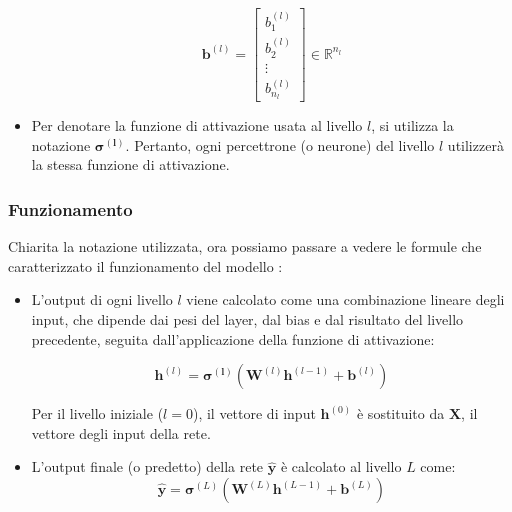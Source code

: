 \begin{itemize}
    \[
        \mathbf{b}^{(l)} = 
        \begin{bmatrix}
        b_1^{(l)} \\
        b_2^{(l)} \\
        \vdots \\
        b_{n_l}^{(l)}
        \end{bmatrix}
        \in \mathbb{R}^{n_l}
    \]

    \item Per denotare la funzione di attivazione usata al livello $l$, si
    utilizza la notazione $\boldsymbol{\sigma^{(l)}}$. Pertanto, ogni percettrone (o neurone) 
    del livello $l$ utilizzerà la stessa funzione di attivazione.
    
\end{itemize}
\subsubsection{Funzionamento}
Chiarita la notazione utilizzata, ora possiamo passare a vedere le formule che
caratterizzato il funzionamento del modello 
\cite{GradientDescent_NeuralNetworks,ALL_DEEP_LEARNING,ASPETTI_MLP_1,ASPETTI_MLP_2}:
\begin{itemize}

    \item L'output di ogni livello \( l \) viene calcolato come una combinazione 
    lineare degli input, che dipende dai pesi del layer, dal bias e dal risultato del 
    livello precedente, seguita dall'applicazione della funzione di attivazione:
    
    \begin{equation}
        \mathbf{h}^{(l)} = \boldsymbol{\sigma^{(l)}}\left( \mathbf{W}^{(l)} \mathbf{h}^{(l-1)} + \mathbf{b}^{(l)} \right)
        \label{MPL_LAYER}
    \end{equation}
    
    Per il livello iniziale ($l=0$), il vettore di input $\mathbf{h}^{(0)}$ è sostituito da $\mathbf{X}$, il vettore degli input della rete.
   
    \item L'output finale (o predetto) della rete $\hat{\mathbf{y}}$ è calcolato al livello $L$ come:
    \begin{equation}
        \hat{\mathbf{y}} = \boldsymbol{\sigma}^{(L)}\left( \mathbf{W}^{(L)} \mathbf{h}^{(L-1)} + \mathbf{b}^{(L)} \right)
        \label{MPL_OUTPUT}
    \end{equation}
   

\end{itemize}

